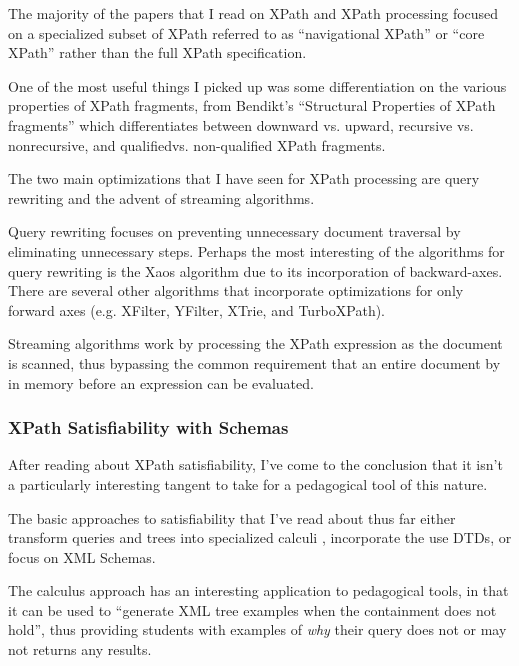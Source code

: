 \documentclass{acm_proc_article-sp}
\begin{document}
The majority of the papers that I read on XPath and XPath processing focused on a specialized subset of XPath referred to as  ``navigational XPath'' or ``core XPath'' rather than the full XPath specification.   



One of the most useful things I picked up was some differentiation on the various properties of XPath fragments, from Bendikt's  ``Structural Properties of XPath fragments''\cite{benedikt:structural} which differentiates between downward vs. upward, recursive vs. nonrecursive, and qualifiedvs. non-qualified XPath fragments.

The two main optimizations that I have seen for XPath processing are query rewriting\cite{koch:processing} and the advent of streaming algorithms\cite{barton:streaming}.

Query rewriting focuses on preventing unnecessary document traversal by eliminating unnecessary steps.  Perhaps the most interesting of the algorithms for query rewriting is the Xaos algorithm\cite{barton:streaming} due to its incorporation of backward-axes.  There are several other algorithms that incorporate optimizations for only forward axes (e.g. XFilter, YFilter, XTrie, and TurboXPath).

Streaming algorithms work by processing the XPath expression as the document is scanned, thus bypassing the common requirement that an entire document by in memory before an expression can be evaluated.

\subsubsection{XPath Satisfiability with Schemas}
After reading about XPath satisfiability, I've come to the conclusion that it isn't a particularly interesting tangent to take for a pedagogical tool of this nature.

The basic approaches to satisfiability that I've read about thus far either  transform queries and trees into specialized calculi \cite{geneve:static}, incorporate the use DTDs\cite{benedikt:satisfiability}, or   focus on XML Schemas\cite{groppe:filtering}.

The calculus approach has an interesting application to pedagogical tools, in that it can be used to ``generate XML tree examples when the containment does not hold''\cite{geneve:static}, thus providing students with examples of \emph{why} their query does not or may not returns any results.
\end{document}
